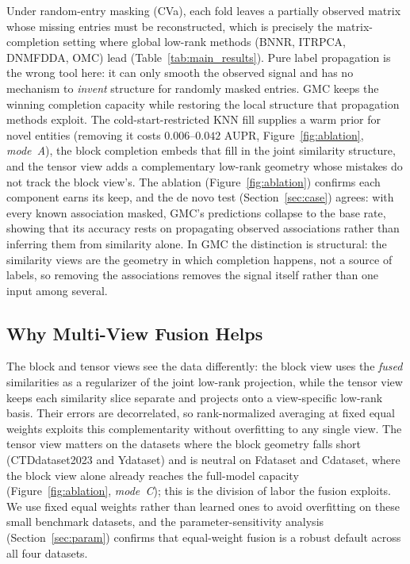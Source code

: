 \documentclass[webpdf,modern,large]{oup-authoring-template}
\newcommand{\gmcmode}[1]{\emph{mode~#1}}   %
\begin{document}
Under random-entry masking (CVa), each fold leaves a partially observed matrix whose missing entries must be reconstructed, which is precisely the matrix-completion setting where global low-rank methods (BNNR, ITRPCA, DNMFDDA, OMC) lead (Table~\ref{tab:main_results}). Pure label propagation is the wrong tool here: it can only smooth the observed signal and has no mechanism to \emph{invent} structure for randomly masked entries. GMC keeps the winning completion capacity while restoring the local structure that propagation methods exploit. The cold-start-restricted KNN fill supplies a warm prior for novel entities (removing it costs $0.006$--$0.042$ AUPR, Figure~\ref{fig:ablation}, \gmcmode{A}), the block completion embeds that fill in the joint similarity structure, and the tensor view adds a complementary low-rank geometry whose mistakes do not track the block view's. The ablation (Figure~\ref{fig:ablation}) confirms each component earns its keep, and the de novo test (Section~\ref{sec:case}) agrees: with every known association masked, GMC's predictions collapse to the base rate, showing that its accuracy rests on propagating observed associations rather than inferring them from similarity alone. In GMC the distinction is structural: the similarity views are the geometry in which completion happens, not a source of labels, so removing the associations removes the signal itself rather than one input among several.

\subsection{Why Multi-View Fusion Helps}

The block and tensor views see the data differently: the block view uses the \emph{fused} similarities as a regularizer of the joint low-rank projection, while the tensor view keeps each similarity slice separate and projects onto a view-specific low-rank basis. Their errors are decorrelated, so rank-normalized averaging at fixed equal weights exploits this complementarity without overfitting to any single view. The tensor view matters on the datasets where the block geometry falls short (CTDdataset2023 and Ydataset) and is neutral on Fdataset and Cdataset, where the block view alone already reaches the full-model capacity (Figure~\ref{fig:ablation}, \gmcmode{C}); this is the division of labor the fusion exploits. We use fixed equal weights rather than learned ones to avoid overfitting on these small benchmark datasets, and the parameter-sensitivity analysis (Section~\ref{sec:param}) confirms that equal-weight fusion is a robust default across all four datasets.
\end{document}
